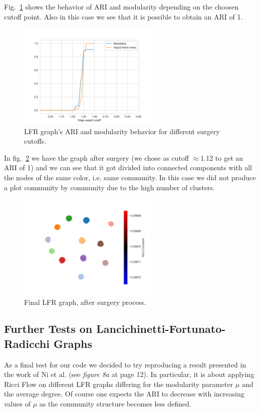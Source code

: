 Fig.~\ref{fig:LFR_Accuracy} shows the behavior of ARI and modularity depending on the choosen cutoff point. Also in this case we see that it is possible to obtain an ARI of 1.
\begin{figure}
    \centering
    \includegraphics[width=0.6\textwidth]{../tests/ToyModelResults/LFR/Surgery Accuracy.png}
    \caption{LFR graph's ARI and modularity behavior for different surgery cutoffs.}
    \label{fig:LFR_Accuracy}
\end{figure}

In fig.~\ref{fig:LFR_Surgery} we have the graph after surgery (we chose as cutoff $\approx$1.12 to get an ARI of 1) and we can see that it got divided into connected components with all the nodes of the same color, i.e. same community. In this case we did not produce a plot community by community due to the high number of clusters. 
\begin{figure}
    \centering
    \includegraphics[width=0.6\textwidth]{../tests/ToyModelResults/LFR/After Surgery.png}
        \caption{Final LFR graph, after surgery process.}
        \label{fig:LFR_Surgery}
\end{figure}

\subsection{Further Tests on Lancichinetti-Fortunato-Radicchi Graphs}
As a final test for our code we decided to try reproducing a result presented in the work of Ni et al. \cite{Ni:communitydetectionnetworksricci} (see \textit{figure 8a} at page 12). In particular, it is about applying Ricci Flow on different LFR graphs differing for the modularity parameter $\mu$ and the average degree. Of course one expects the ARI to decrease with increasing values of $\mu$ as the community structure becomes less defined.

